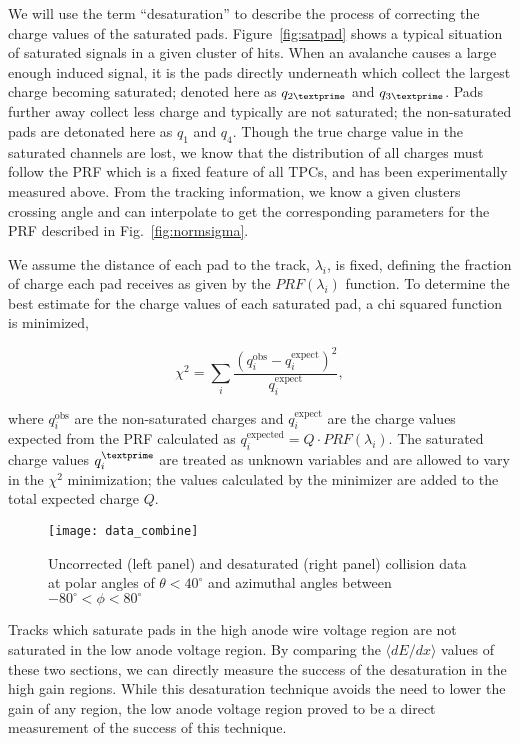 We will use the term ``desaturation'' to describe the process of correcting the charge values of the saturated pads. Figure~\ref{fig:satpad} shows a typical situation of saturated signals in a given cluster of hits. When an avalanche causes a large enough induced signal, it is the pads directly underneath which collect the largest charge becoming saturated; denoted here as $q_{2\textprime}$ and $q_{3\textprime}$. Pads further away collect less charge and typically are not saturated; the non-saturated pads are detonated here as $q_{1}$ and $q_{4}$. Though the true charge value in the saturated channels are lost, we know that the distribution of all charges must follow the PRF which is a fixed feature of all TPCs, and has been experimentally measured above. From the tracking information, we know a given clusters crossing angle and can interpolate to get the corresponding parameters for the PRF described in Fig.~\ref{fig:normsigma}.

We assume the distance of each pad to the track, $\lambda_i$, is fixed, defining the fraction of charge each pad receives as given by the $PRF(\lambda_i)$ function. To determine the best estimate for the charge values of each saturated pad, a chi squared function is minimized,

\begin{equation}\label{eq:chi}
\chi^2 = \sum_i \frac{(q_i^{\mathrm{obs}} - q_i^{\mathrm{expect}})^2}{q_i^{\mathrm{expect}}},
\end{equation}


where $q_i^{\mathrm{obs}}$ are the non-saturated charges and $q_i^{\mathrm{expect}}$ are the charge values expected from the PRF calculated as $q_i^{\mathrm{expected}} = Q\cdot PRF(\lambda_i)$. The saturated charge values $q_{i}^{\textprime}$ are treated as unknown variables and are allowed to vary in the $\chi^2$ minimization; the values calculated by the minimizer are added to the total expected charge $Q$. 


\begin{figure*}[t]
\texttt{[image: data\_combine]}
\caption{Uncorrected (left panel) and desaturated (right panel) collision data at polar angles of $\theta < 40^{\circ}$ and azimuthal angles between $-80^{\circ} < \phi < 80^{\circ}$}
\label{fig:data_combine}
\end{figure*}

Tracks which saturate pads in the high anode wire voltage region are not saturated in the low anode voltage region. By comparing the $\langle dE/dx\rangle$ values of these two sections, we can directly measure the success of the desaturation in the high gain regions. While this desaturation technique avoids the need to lower the gain of any region, the low anode voltage region proved to be a direct measurement of the success of this technique.
 
